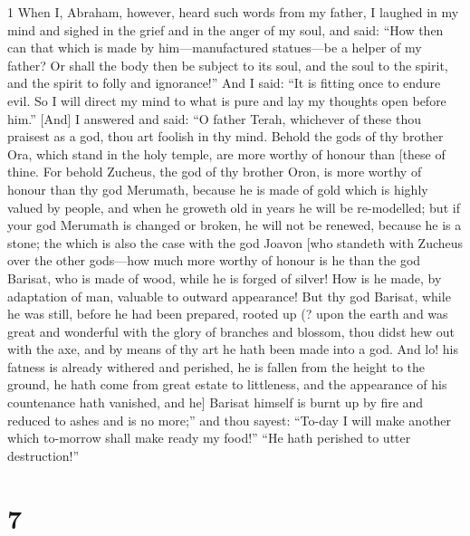 \par 1 When I, Abraham, however, heard such words from my father, I laughed in my mind and sighed in the grief and in the anger of my soul, and said: “How then can that which is made by him—manufactured statues—be a helper of my father? Or shall the body then be subject to its soul, and the soul to the spirit, and the spirit to folly and ignorance!” And I said: “It is fitting once to endure evil. So I will direct my mind to what is pure and lay my thoughts open before him.” [And] I answered and said: “O father Terah, whichever of these thou praisest as a god, thou art foolish in thy mind. Behold the gods of thy brother Ora, which stand in the holy temple, are more worthy of honour than [these of thine. For behold Zucheus, the god of thy brother Oron, is more worthy of honour than thy god Merumath, because he is made of gold which is highly valued by people, and when he groweth old in years he will be re-modelled; but if your god Merumath is changed or broken, he will not be renewed, because he is a stone; the which is also the case with the god Joavon [who standeth with Zucheus over the other gods—how much more worthy of honour is he than the god Barisat, who is made of wood, while he is forged of silver! How is he made, by adaptation of man, valuable to outward appearance! But thy god Barisat, while he was still, before he had been prepared, rooted up (? upon the earth and was great and wonderful with the glory of branches and blossom, thou didst hew out with the axe, and by means of thy art he hath been made into a god. And lo! his fatness is already withered and perished, he is fallen from the height to the ground, he hath come from great estate to littleness, and the appearance of his countenance hath vanished, and he] Barisat himself is burnt up by fire and reduced to ashes and is no more;” and thou sayest: “To-day I will make another which to-morrow shall make ready my food!” “He hath perished to utter destruction!”

\chapter{7}

